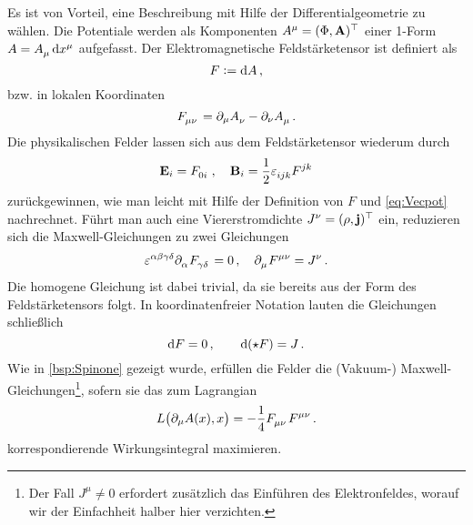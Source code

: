 Es ist von Vorteil, eine Beschreibung mit Hilfe der Differentialgeometrie
zu wählen.
Die Potentiale werden als Komponenten
$\tensor{A}{^\mu}=(\Phi,\vec{A})\transpose$ einer 1-Form
$A=\tensor{A}{_\mu}\dif\tensor{x}{^\mu}$ aufgefasst.
Der Elektromagnetische Feldstärketensor ist definiert als
\begin{equation}
F:=\dif
A\,,
\end{equation}
bzw. in lokalen Koordinaten
\begin{equation}
\tensor{F}{_\mu_\nu}=\partial_\mu\tensor{A}{_\nu}-\partial_\nu\tensor{A}{_\mu}\,.
\end{equation}
Die physikalischen Felder lassen sich aus dem Feldstärketensor wiederum durch
\begin{equation}
\vec{E}_{i}=\tensor{F}{_0_i}\,,\quad
\vec{B}_i=\frac{1}{2}\tensor{\varepsilon}{_i_j_k}\tensor{F}{^j^k}
\end{equation}
zurückgewinnen, wie man leicht mit Hilfe der Definition von $F$ und
\eqref{eq:Vecpot} nachrechnet. Führt man auch eine Viererstromdichte
$\tensor{J}{^\nu}=(\rho,\vec{j})\transpose$ ein,
reduzieren sich die Maxwell-Gleichungen zu zwei
Gleichungen
\begin{equation}
\tensor{\varepsilon}{^\alpha^\beta^\gamma^\delta}
\pdif{_{\alpha}}\tensor{F}{_\gamma_{\delta}}=0\,,\quad
\pdif{_\mu}\tensor{F}{^\mu^\nu}=\tensor{J}{^\nu}\,.
\end{equation}
Die homogene Gleichung ist dabei trivial, da sie bereits aus der Form des
Feldstärketensors folgt.
In koordinatenfreier Notation lauten die Gleichungen schließlich 
\begin{equation}
\dif F = 0\,,\quad\quad \dif\,(\star F)= J\,.
\end{equation}
Wie in \autoref{bsp:Spinone} gezeigt wurde, erfüllen die Felder die (Vakuum-)
Maxwell-Gleichungen\footnote{Der Fall $J^\mu\neq 0$ erfordert zusätzlich das
Einführen des Elektronfeldes, worauf wir der Einfachheit halber hier
verzichten.}, sofern sie das zum Lagrangian
\begin{equation}
L\left(\partial_\mu
A(x),x\right)=-\frac{1}{4}\tensor{F}{_\mu_\nu}\tensor{F}{^\mu^\nu} \,.
\end{equation}
korrespondierende Wirkungsintegral maximieren.
